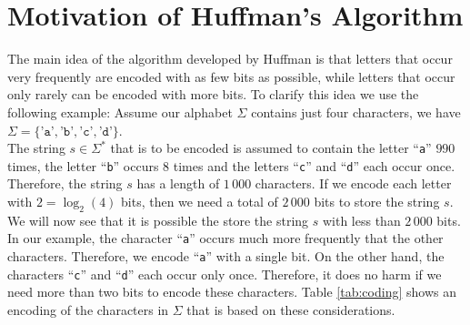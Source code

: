 \section[Motivation]{Motivation of  Huffman's Algorithm \label{sec:huffman}}
The main idea of the
algorithm developed by Huffman is that letters that occur very frequently are encoded with
as few bits as possible, while letters that occur only rarely can be encoded with more bits. 
To clarify this idea we use the following example:  Assume our alphabet $\Sigma$ contains just four characters, we have
\\[0.2cm]
\hspace*{1.3cm}
$\Sigma = \{ \texttt{'a'}, \texttt{'b'}, \texttt{'c'}, \texttt{'d'} \}$. 
\\[0.2cm]
The string $s \in \Sigma^*$ that is to be encoded is assumed to contain the letter
``\texttt{a}'' $990$ times, the letter ``\texttt{b}'' occurs $8$ times and the letters ``\texttt{c}'' and
``\texttt{d}'' each occur once.  Therefore, the string $s$ has a length of $1\,000$ characters.
If we encode each letter with $2 = \log_2(4)$ bits, then we need a total of $2\,000$ bits to store the string $s$.
We will now see that it is possible the store the string $s$ with less than $2\,000$ bits.
In our example, the character ``\texttt{a}'' occurs much more frequently that the other characters.  Therefore, we
encode ``\texttt{a}'' with a single bit.  On the other hand, the characters ``\texttt{c}'' and ``\texttt{d}''
each occur only once.  Therefore, it does no harm if we need more than two bits to encode these characters.
Table \ref{tab:coding} shows an encoding of the characters in $\Sigma$ that is based on these considerations.


